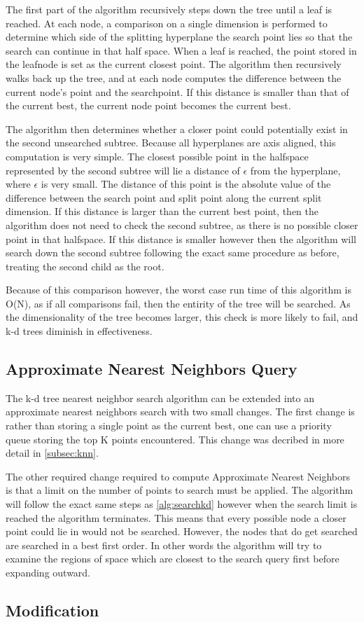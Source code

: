 The first part of the algorithm recursively steps down the tree until a leaf is reached.  At each node, a comparison on a single dimension is performed to determine which side of the splitting hyperplane the search point lies so that the search can continue in that half space.  When a leaf is reached, the point stored in the leafnode is set as the current closest point.  The algorithm then recursively walks back up the tree, and at each node computes the difference between the current node's point and the searchpoint.  If this distance is smaller than that of the current best, the current node point becomes the current best.

The algorithm then determines whether a closer point could potentially exist in the second unsearched subtree.  Because all hyperplanes are axis aligned, this computation is very simple.  The closest possible point in the halfspace represented by the second subtree will lie a distance of $\epsilon$ from the hyperplane, where $\epsilon$ is very small.  The distance of this point is the absolute value of the difference between the search point and split point along the current split dimension.  If this distance is larger than the current best point, then the algorithm does not need to check the second subtree, as there is no possible closer point in that halfspace.  If this distance is smaller however then the algorithm will search down the second subtree following the exact same procedure as before, treating the second child as the root.

Because of this comparison however, the worst case run time of this algorithm is O(N), as if all comparisons fail, then the entirity of the tree will be searched.  As the dimensionality of the tree becomes larger, this check is more likely to fail, and k-d trees diminish in effectiveness.

\subsection{Approximate Nearest Neighbors Query}

The k-d tree nearest neighbor search algorithm can be extended into an approximate nearest neighbors search with two small changes.  The first change is rather than storing a single point as the current best, one can use a priority queue storing the top K points encountered.  This change was decribed in more detail in \ref{subsec:knn}.

The other required change required to compute Approximate Nearest Neighbors is that a limit on the number of points to search must be applied.  The algorithm will follow the exact same steps as \ref{alg:searchkd} however when the search limit is reached the algorithm terminates.  This means that every possible node a closer point could lie in would not be searched.  However, the nodes that do get searched are searched in a best first order.  In other words the algorithm will try to examine the regions of space which are closest to the search query first before expanding outward.

\subsection{Modification}

